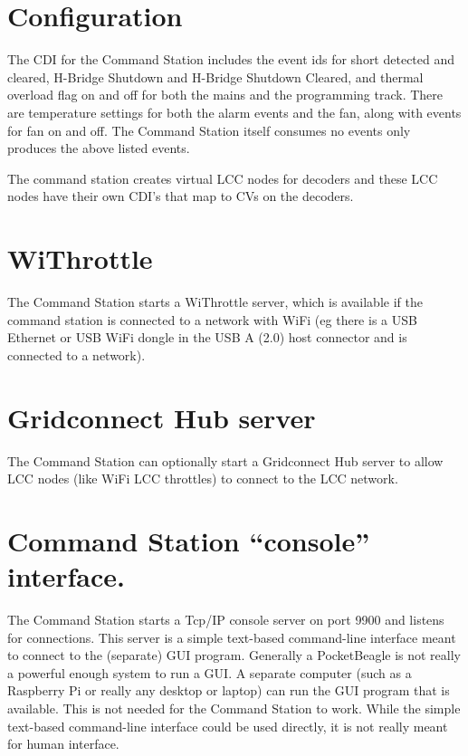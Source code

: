 \section{Configuration}

The CDI for the Command Station includes the event ids for short detected and 
cleared, H-Bridge Shutdown and H-Bridge Shutdown Cleared, and thermal overload 
flag on and off for both the mains and the programming track.  There are 
temperature settings for both the alarm events and the fan, along with events 
for fan on and off.  The Command Station itself consumes no events only 
produces the above listed events.

The command station creates virtual LCC nodes for decoders and these LCC nodes 
have their own CDI's that map to CVs on the decoders.

\section{WiThrottle}

The Command Station starts a WiThrottle server, which is available if the 
command station is connected to a network with WiFi (eg there is a USB 
Ethernet or USB WiFi dongle in the USB A (2.0) host connector and is connected 
to a network).

\section{Gridconnect Hub server}

The Command Station can optionally start a Gridconnect Hub server to allow LCC 
nodes (like WiFi LCC throttles) to connect to the LCC network.

\section{Command Station ``console'' interface.}

The Command Station starts a Tcp/IP console server on port 9900 and listens
for connections. This server is a simple text-based command-line interface
meant to connect to the (separate) GUI program. Generally a PocketBeagle is
not really a powerful enough system to run a GUI. A separate computer (such as
a Raspberry Pi or really any desktop or laptop) can run the GUI program that
is available. This is not needed for the Command Station to work. While the
simple text-based command-line interface could be used directly, it is not
really meant for human interface.

